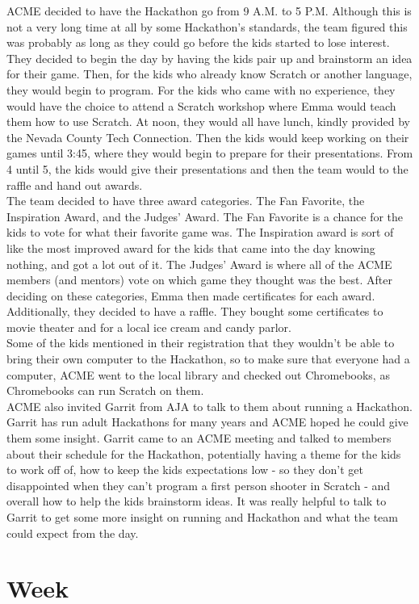\documentclass{article}
\begin{document}
ACME decided to have the Hackathon go from 9 A.M. to 5 P.M. Although this is not a very long time at all by some Hackathon's standards, the team figured this was probably as long as they could go before the kids started to lose interest. They decided to begin the day by having the kids pair up and brainstorm an idea for their game. Then, for the kids who already know Scratch or another language, they would begin to program. For the kids who came with no experience, they would have the choice to attend a Scratch workshop where Emma would teach them how to use Scratch. At noon, they would all have lunch, kindly provided by the Nevada County Tech Connection. Then the kids would keep working on their games until 3:45, where they would begin to prepare for their presentations. From 4 until 5, the kids would give their presentations and then the team would to the raffle and hand out awards. \\

The team decided to have three award categories. The Fan Favorite, the Inspiration Award, and the Judges' Award. The Fan Favorite is a chance for the kids to vote for what their favorite game was. The Inspiration award is sort of like the most improved award for the kids that came into the day knowing nothing, and got a lot out of it. The Judges' Award is where all of the ACME members (and mentors) vote on which game they thought was the best. After deciding on these categories, Emma then made certificates for each award. Additionally, they decided to have a raffle. They bought some certificates to movie theater and for a local ice cream and candy parlor. \\

Some of the kids mentioned in their registration that they wouldn't be able to bring their own computer to the Hackathon, so to make sure that everyone had a computer, ACME went to the local library and checked out Chromebooks, as Chromebooks can run Scratch on them. \\

ACME also invited Garrit from AJA to talk to them about running a Hackathon. Garrit has run adult Hackathons for many years and ACME hoped he could give them some insight. Garrit came to an ACME meeting and talked to members about their schedule for the Hackathon, potentially having a theme for the kids to work off of, how to keep the kids expectations low - so they don't get disappointed when they can't program a first person shooter in Scratch - and overall how to help the kids brainstorm ideas. It was really helpful to talk to Garrit to get some more insight on running and Hackathon and what the team could expect from the day. \\
\clearpage \newpage \section{Week \thesection} 
\end{document}

